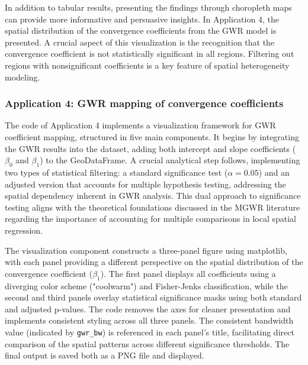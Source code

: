 \documentclass[smallextended, natbib]{svjour3}       %
\begin{document}
In addition to tabular results, presenting the findings through choropleth maps can provide more informative and persuasive insights.
In Application 4, the spatial distribution of the convergence coefficients from the GWR model is presented.
A crucial aspect of this visualization is the recognition that the convergence coefficient is not statistically significant in all regions.
Filtering out regions with nonsignificant coefficients is a key feature of spatial heterogeneity modeling.

\subsubsection*{Application 4: GWR mapping of convergence coefficients}

The code of Application 4 implements a visualization framework for GWR coefficient mapping, structured in five main components. 
It begins by integrating the GWR results into the dataset, adding both intercept and slope coefficients ($\beta_0$ and $\beta_1$) to the GeoDataFrame. 
A crucial analytical step follows, implementing two types of statistical filtering: a standard significance test ($\alpha = 0.05$) and an adjusted version that accounts for multiple hypothesis testing, addressing the spatial dependency inherent in GWR analysis. 
This dual approach to significance testing aligns with the theoretical foundations discussed in the MGWR literature regarding the importance of accounting for multiple comparisons in local spatial regression.

The visualization component constructs a three-panel figure using matplotlib, with each panel providing a different perspective on the spatial distribution of the convergence coefficient ($\beta_1$). 
The first panel displays all coefficients using a diverging color scheme ("coolwarm") and Fisher-Jenks classification, while the second and third panels overlay statistical significance masks using both standard and adjusted p-values. 
The code removes the axes for cleaner presentation and implements consistent styling across all three panels. 
The consistent bandwidth value (indicated by \verb|gwr_bw|) is referenced in each panel's title, facilitating direct comparison of the spatial patterns across different significance thresholds. 
The final output is saved both as a PNG file and displayed. 
\end{document}
